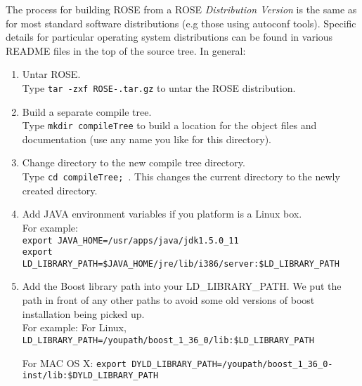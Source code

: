    The process for building ROSE from a ROSE {\em Distribution Version} is the same as for
   most standard software distributions (e.g those using autoconf tools). Specific details for particular
   operating system distributions can be found in various README files in the top of the source tree. In
   general:
\begin{enumerate}
     \item Untar ROSE. \\
           Type {\tt tar -zxf ROSE-\VersionNumber.tar.gz} to untar the ROSE distribution.
     \item Build a separate compile tree. \\
           Type {\tt mkdir compileTree} to build a location for the object files and
           documentation (use any name you like for this directory).
     \item Change directory to the new compile tree directory. \\
           Type {\tt cd compileTree; }. This changes the current directory to the newly
           created directory.
     \item Add JAVA environment variables if you platform is a Linux box. \\
           For example:\\
           {\tt export JAVA\_HOME=/usr/apps/java/jdk1.5.0\_11} \\
           {\tt export LD\_LIBRARY\_PATH=\$JAVA\_HOME/jre/lib/i386/server:\$LD\_LIBRARY\_PATH}

     \item Add the Boost library path into your LD\_LIBRARY\_PATH. We put
     the path in front of any other paths to avoid some old versions of
     boost installation being picked up. \\
           For example: For Linux, 
           {\tt LD\_LIBRARY\_PATH=/youpath/boost\_1\_36\_0/lib:\$LD\_LIBRARY\_PATH} 

           For MAC OS X: 
           {\tt export
           DYLD\_LIBRARY\_PATH=/youpath/boost\_1\_36\_0-inst/lib:\$DYLD\_LIBRARY\_PATH}


\end{enumerate}
